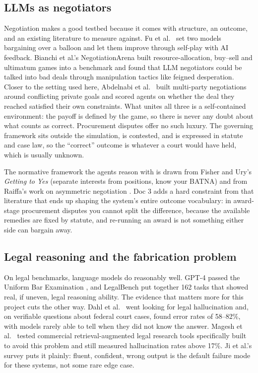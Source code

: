 \subsection*{LLMs as negotiators}

Negotiation makes a good testbed because it comes with structure, an outcome,
and an existing literature to measure against. Fu et al.\ \cite{fu2023negotiation}
set two models bargaining over a balloon and let them improve through self-play
with AI feedback. Bianchi et al.'s NegotiationArena \cite{bianchi2024negotiation}
built resource-allocation, buy--sell and ultimatum games into a benchmark and
found that LLM negotiators could be talked into bad deals through manipulation
tactics like feigned desperation. Closer to the setting used here, Abdelnabi et
al.\ \cite{abdelnabi2024negotiation} built multi-party negotiations around
conflicting private goals and scored agents on whether the deal they reached
satisfied their own constraints. What unites all three is a self-contained
environment: the payoff is defined by the game, so there is never any doubt about
what counts as correct. Procurement disputes offer no such luxury. The governing
framework sits outside the simulation, is contested, and is expressed in statute
and case law, so the ``correct'' outcome is whatever a court would have held,
which is usually unknown.

The normative framework the agents reason with is drawn from Fisher and Ury's
\emph{Getting to Yes} \cite{fisher2011getting} (separate interests from positions,
know your BATNA) and from Raiffa's work on asymmetric negotiation
\cite{raiffa1982art}. Doc 3 adds a hard constraint from that literature that
ends up shaping the system's entire outcome vocabulary: in award-stage
procurement disputes you cannot split the difference, because the
available remedies are fixed by statute, and re-running an award is not
something either side can bargain away.

\subsection*{Legal reasoning and the fabrication problem}

On legal benchmarks, language models do reasonably well. GPT-4 passed the
Uniform Bar Examination \cite{katz2024gpt4}, and LegalBench
\cite{guha2023legalbench} put together 162 tasks that showed real, if uneven,
legal reasoning ability. The evidence that matters more for this project cuts
the other way. Dahl et al.\ \cite{dahl2024legal} went looking for legal
hallucination and, on verifiable questions about federal court cases, found
error rates of 58--82\%, with models rarely able to tell when they did
not know the answer. Magesh et al.\ \cite{magesh2024hallucination} tested
commercial retrieval-augmented legal research tools specifically built to avoid
this problem and still measured hallucination rates above 17\%. Ji et al.'s
survey \cite{ji2023survey} puts it plainly: fluent, confident, wrong output is
the default failure mode for these systems, not some rare edge case.

